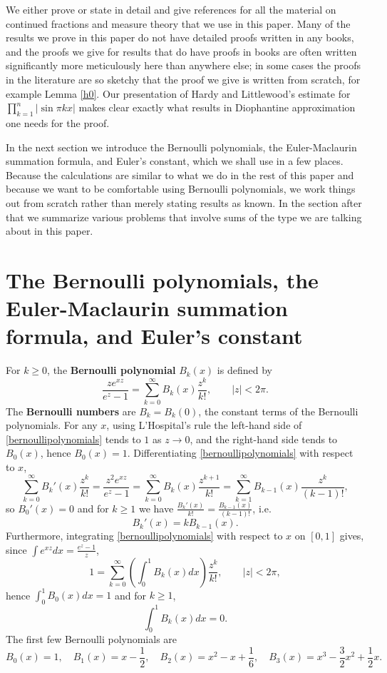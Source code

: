 \documentclass{article}
\begin{document}
We either prove or state in detail and give references for all the material on continued fractions and measure theory that we use in this paper. 
Many of the results we prove in this paper do not have detailed proofs written in any books, and the proofs we give for results
that do have proofs in books are often written significantly more  meticulously here than anywhere else; in some cases the proofs
in the literature are so sketchy that the proof we give is written from scratch, for example Lemma \ref{h0}.
Our presentation of Hardy and Littlewood's estimate for
$\prod_{k=1}^n |\sin \pi kx|$  makes clear exactly what results in Diophantine approximation one needs for the proof.


In the next section we introduce the Bernoulli polynomials, the Euler-Maclaurin summation formula, and Euler's constant, which we shall use in a few places.
Because the calculations are similar to what we do in the rest of this paper and because we want to be comfortable using Bernoulli polynomials, 
we work things out from scratch rather than merely stating results as known.
In the section after  that we summarize various problems that involve sums of the type we are talking about in this paper.





\section{The Bernoulli polynomials, the Euler-Maclaurin summation formula, and Euler's constant}
For $k \geq 0$, the \textbf{Bernoulli polynomial} $B_k(x)$ is defined by
\begin{equation}
\frac{ze^{xz}}{e^z-1} = \sum_{k=0}^\infty B_k(x) \frac{z^k}{k!},\qquad |z|<2\pi.
\label{bernoullipolynomials}
\end{equation}
The \textbf{Bernoulli numbers} are $B_k = B_k(0)$, the constant terms of the Bernoulli polynomials.
For any $x$, using L'Hospital's rule the left-hand side of \eqref{bernoullipolynomials} tends to $1$ as $z \to 0$, and the right-hand side
tends to $B_0(x)$, hence $B_0(x)=1$. 
Differentiating \eqref{bernoullipolynomials} with respect to $x$,
\[
\sum_{k=0}^\infty B_k'(x) \frac{z^k}{k!} = \frac{z^2 e^{xz}}{e^z-1} = \sum_{k=0}^\infty B_k(x) \frac{z^{k+1}}{k!}
=\sum_{k=1}^\infty B_{k-1}(x) \frac{z^k}{(k-1)!},
\]
so $B_0'(x) = 0$ and for $k \geq 1$ we have $\frac{B_k'(x)}{k!} = \frac{B_{k-1}(x)}{(k-1)!}$, i.e.
\[
B_k'(x)=k B_{k-1}(x).
\]
Furthermore, integrating \eqref{bernoullipolynomials} with respect
to $x$ on $[0,1]$ gives, since $\int e^{xz} dx = \frac{e^z-1}{z}$,
\[
1 = \sum_{k=0}^\infty \left( \int_0^1 B_k(x) dx \right) \frac{z^k}{k!},\qquad |z|<2\pi,
\]
hence $\int_0^1 B_0(x) dx =1$ and for $k \geq 1$,
\[
\int_0^1 B_k(x) dx = 0.
\] 
The first few Bernoulli polynomials are
\[
B_0(x)=1,\quad B_1(x) = x-\frac{1}{2},\quad B_2(x) = x^2-x+\frac{1}{6},
\quad B_3(x)=x^3-\frac{3}{2}x^2+\frac{1}{2}x.
\]
\end{document}
